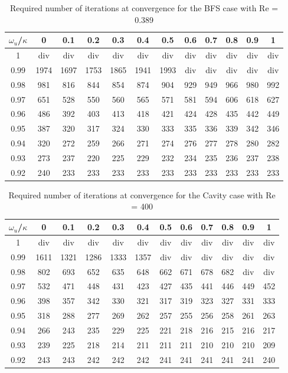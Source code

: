 \documentclass[final,3p,times,11pt,onecolumn]{myElsarticle}
\numberwithin{equation}{section}
\begin{document}
\begin{table}[b!!]
\centering
\begin{tabular}{c|ccccccccccc}
\hline 
$\omega_u$/$\kappa$ & 0 & 0.1 & 0.2 & 0.3 & 0.4 & 0.5 & 0.6 & 0.7 & 0.8 & 0.9 & 1 \\ 
\hline 
1 & div & div & div & div & div & div & div & div & div & div & div \\ 
0.99 & 1974 & 1697 & 1753 & 1865 & 1941 & 1993 & div & div & div & div & div \\ 
0.98 & 981 & 816 & 844 & 854 & 874 & 904 & 929 & 949 & 966 & 980 & 992 \\ 
0.97 & 651 & 528 & 550 & 560 & 565 & 571 & 581 & 594 & 606 & 618 & 627 \\ 
0.96 & 486 & 392 & 403 & 413 & 418 & 421 & 424 & 428 & 435 & 442 & 449 \\ 
0.95 & 387 & 320 & 317 & 324 & 330 & 333 & 335 & 336 & 339 & 342 & 346 \\ 
0.94 & 320 & 272 & 259 & 266 & 271 & 274 & 276 & 277 & 278 & 280 & 282 \\ 
0.93 & 273 & 237 & 220 & 225 & 229 & 232 & 234 & 235 & 236 & 237 & 238 \\ 
0.92 & 240 & 233 & 233 & 233 & 233 & 233 & 233 & 233 & 233 & 233 & 233 \\ 
\hline 
\end{tabular}
\caption{Required number of iterations at convergence for the BFS case with Re = 0.389}
\label{Table:BFS_LowRe}
\end{table}
\begin{table}[t!!]
\centering
\begin{tabular}{c|ccccccccccc}
\hline 
$\omega_u$/$\kappa$ & 0 & 0.1 & 0.2 & 0.3 & 0.4 & 0.5 & 0.6 & 0.7 & 0.8 & 0.9 & 1 \\ 
\hline 
1 & div & div & div & div & div & div & div & div & div & div & div \\ 
0.99 & 1611 & 1321 & 1286 & 1333 & 1357 & div & div & div & div & div & div \\ 
0.98 & 802 & 693 & 652 & 635 & 648 & 662 & 671 & 678 & 682 & div & div \\ 
0.97 & 532 & 471 & 448 & 431 & 423 & 427 & 435 & 441 & 446 & 449 & 452 \\ 
0.96 & 398 & 357 & 342 & 330 & 321 & 317 & 319 & 323 & 327 & 331 & 333 \\ 
0.95 & 318 & 288 & 277 & 269 & 262 & 257 & 255 & 256 & 258 & 261 & 263 \\ 
0.94 & 266 & 243 & 235 & 229 & 225 & 221 & 218 & 216 & 215 & 216 & 217 \\ 
0.93 & 239 & 225 & 218 & 214 & 211 & 211 & 211 & 210 & 210 & 210 & 209 \\ 
0.92 & 243 & 243 & 242 & 242 & 242 & 241 & 241 & 241 & 241 & 241 & 240 \\ 
\hline 
\end{tabular}
\caption{Required number of iterations at convergence for the Cavity case with Re = 400}
\label{Table:Cavity_HighRe}
\end{table}
\end{document}

